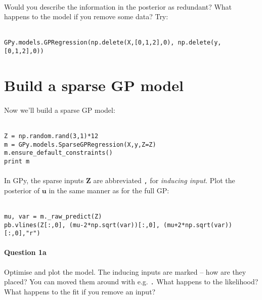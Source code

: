 \documentclass{article}
\newcommand{\mintinline}[1]{\colorbox{bg}{\lstinline[basicstyle=\ttfamily]{#1}}}
\begin{document}
\paragraph{}
Would you describe the information in the posterior as redundant? What happens
to the model if you remove some data? Try:\\ \ \\
\begin{verbatim}
GPy.models.GPRegression(np.delete(X,[0,1,2],0), np.delete(y,[0,1,2],0))
\end{verbatim}

\section{Build a sparse GP model}
\paragraph{}
Now we'll build a sparse GP model:\\ \ \\
\begin{verbatim}
Z = np.random.rand(3,1)*12
m = GPy.models.SparseGPRegression(X,y,Z=Z)
m.ensure_default_constraints()
print m
\end{verbatim}

\paragraph{}
In GPy, the sparse inputs $\mathbf Z$ are abbreviated \texttt, for {\em inducing input}. 
Plot the posterior of $\mathbf u$ in the same manner as for the full GP:\\ \ \\
\begin{verbatim}
mu, var = m._raw_predict(Z) 
pb.vlines(Z[:,0], (mu-2*np.sqrt(var))[:,0], (mu+2*np.sqrt(var))[:,0],"r")
\end{verbatim}

\paragraph{Question 1a}
Optimise and plot the model. The inducing inputs are marked -- how are they placed? You can moved them around with e.g. \texttt. What happens to the likelihood? What happens to the fit if you remove an input?
\end{document}
